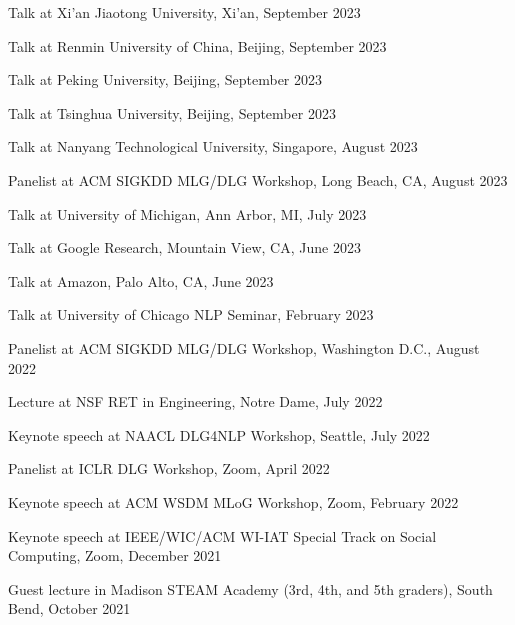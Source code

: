 \documentclass[10pt]{article}
\newenvironment{myindentpar}[1]%
{\begin{list}{}%
         {\setlength{\leftmargin}{#1}}%
         \item[]%
}
{\end{list}}
\newcounter{list}
\begin{document}
\begin{myindentpar}{0.75cm}
\hspace{-0.75cm} Talk at Xi'an Jiaotong University, Xi'an, September 2023

\hspace{-0.75cm} Talk at Renmin University of China, Beijing, September 2023	
	
\hspace{-0.75cm} Talk at Peking University, Beijing, September 2023	

\hspace{-0.75cm} Talk at Tsinghua University, Beijing, September 2023
	
\hspace{-0.75cm} Talk at Nanyang Technological University, Singapore, August 2023	
	
\hspace{-0.75cm} Panelist at ACM SIGKDD MLG/DLG Workshop, Long Beach, CA, August 2023

\hspace{-0.75cm} Talk at University of Michigan, Ann Arbor, MI, July 2023	

\hspace{-0.75cm} Talk at Google Research, Mountain View, CA, June 2023
	
\hspace{-0.75cm} Talk at Amazon, Palo Alto, CA, June 2023
	
\hspace{-0.75cm} Talk at University of Chicago NLP Seminar, February 2023
	
\hspace{-0.75cm} Panelist at ACM SIGKDD MLG/DLG Workshop, Washington D.C., August 2022
	
\hspace{-0.75cm} Lecture at NSF RET in Engineering, Notre Dame, July 2022
	
\hspace{-0.75cm} Keynote speech at NAACL DLG4NLP Workshop, Seattle, July 2022
	
\hspace{-0.75cm} Panelist at ICLR DLG Workshop, Zoom, April 2022
	
\hspace{-0.75cm} Keynote speech at ACM WSDM MLoG Workshop, Zoom, February 2022
	
\hspace{-0.75cm} Keynote speech at IEEE/WIC/ACM WI-IAT Special Track on Social Computing, Zoom, December 2021
	
\hspace{-0.75cm} Guest lecture in Madison STEAM Academy (3rd, 4th, and 5th graders), South Bend, October 2021
	

\end{myindentpar}
\end{document}
